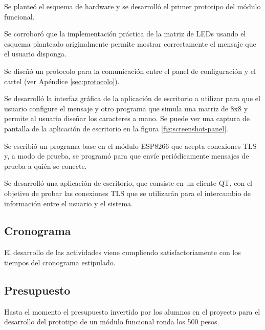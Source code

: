 Se planteó el esquema de hardware y se desarrolló el primer prototipo del módulo funcional.

Se corroboró que la implementación práctica de la matriz de LEDs usando el esquema planteado originalmente permite mostrar correctamente el mensaje que el usuario disponga.

Se diseñó un protocolo para la comunicación entre el panel de configuración y el cartel (ver Apéndice  \ref{sec:protocolo}).

Se desarrolló la interfaz gráfica de la aplicación de escritorio a utilizar para que el usuario configure el mensaje y otro programa que simula una matriz de 8x8 y permite al usuario diseñar los caracteres a mano. Se puede ver una captura de pantalla de la aplicación de escritorio en la figura \ref{fig:screenshot-panel}.

Se escribió un programa base en el módulo ESP8266 que acepta conexiones TLS y, a modo de prueba, se programó para que envíe periódicamente mensajes de prueba a quién se conecte.

Se desarrolló una aplicación de escritorio, que consiste en un cliente QT, con el objetivo de probar las conexiones TLS que se utilizarán para el intercambio de información entre el usuario y el sistema.

\subsection{Cronograma}
El desarrollo de las actividades viene cumpliendo satisfactoriamente con los tiempos del cronograma estipulado.

\subsection{Presupuesto}
Hasta el momento el presupuesto invertido por los alumnos en el proyecto para el desarrollo del prototipo de un módulo funcional ronda los 500 pesos.